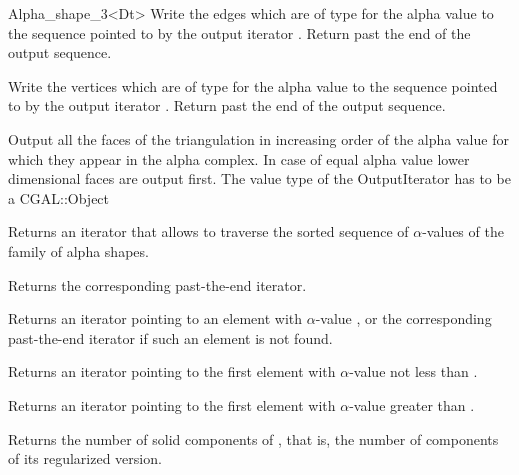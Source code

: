 \begin{ccRefClass} {Alpha_shape_3<Dt>}
{Write the edges which are of type  for 
the alpha value  to the sequence
pointed to by the output iterator . Return past the end
of the output sequence.}

{Write the vertices which are of type  for 
the alpha value  to the sequence
pointed to by the output iterator . Return past the end
of the output sequence.}

{Output all the faces  of the triangulation
in increasing order of  the alpha value for which they appear
in the alpha complex. In case of equal alpha value
lower dimensional faces are output first.
The value type of the OutputIterator has to be a  CGAL::Object}



{Returns an iterator that allows to traverse the
sorted sequence of $\alpha$-values of the family of alpha shapes.}

{Returns the corresponding past-the-end iterator.}

{Returns an iterator pointing to an element with $\alpha$-value
, or the corresponding past-the-end iterator if such 
an element is not found.}

{Returns an iterator pointing to the first element with
$\alpha$-value not less than .}

{Returns an iterator pointing to the first element with $\alpha$-value
greater than .}


{Returns the number of solid components of \ccVar, that is, the number of
components of its 
regularized version.}


\end{ccRefClass}
